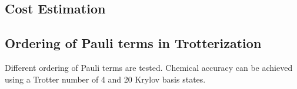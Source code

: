 \documentclass[journal=jctcce,manuscript=article]{achemso}
\begin{document}
\subsection{Cost Estimation}





\subsection{Ordering of Pauli terms in Trotterization}

Different ordering of Pauli terms are tested.
Chemical accuracy can be achieved using a Trotter number of 4 and 20 Krylov basis states.
\end{document}
